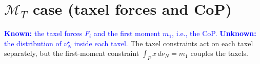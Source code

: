 \documentclass[11pt,a4paper]{article}
\theoremstyle{plain}
\newtheorem{remark}[theorem]{Remark}
\begin{document}

\section{$\mathcal{M}_T$ case (taxel forces and CoP)}
\label{sec:MT}

\textcolor{blue}{\textbf{Known:} the taxel forces $F_i$ and the first moment $m_1$, i.e., the CoP. \textbf{Unknown:} the distribution of $\nu_N^\star$ inside each taxel.}
The taxel constraints act on each taxel separately, but the first-moment constraint $\int_Px\,d\nu_N=m_1$ couples the taxels.
\end{document}
